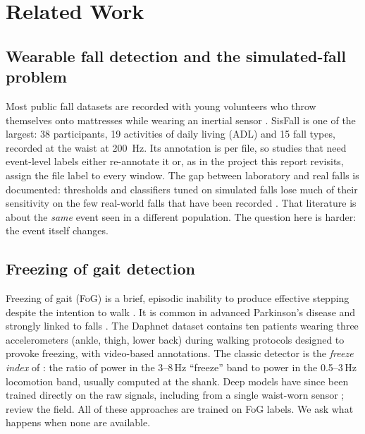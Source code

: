 \chapter{Related Work}
\label{ch:related}

\section{Wearable fall detection and the simulated-fall problem}

Most public fall datasets are recorded with young volunteers who throw themselves onto mattresses
while wearing an inertial sensor \parencite{casilari2017datasets}. SisFall \parencite{sucerquia2017sisfall} is one of the
largest: 38 participants, 19 activities of daily living (ADL) and 15 fall types, recorded at the
waist at \SI{200}{\hertz}. Its annotation is per file, so studies that need event-level labels either
re-annotate it \parencite{musci2021online} or, as in the project this report revisits, assign the file label
to every window. The gap between laboratory and real falls is documented: thresholds and classifiers
tuned on simulated falls lose much of their sensitivity on the few real-world falls that have been
recorded \parencite{bagala2012realfalls,broadley2018realworld}. That literature is about the \emph{same} event
seen in a different population. The question here is harder: the event itself changes.

\section{Freezing of gait detection}

Freezing of gait (FoG) is a brief, episodic inability to produce effective stepping despite the
intention to walk \parencite{nutt2011fog}. It is common in advanced Parkinson's disease and strongly linked to
falls \parencite{bloem2021parkinson,allen2013falls}. The Daphnet dataset \parencite{bachlin2010daphnet} contains ten patients
wearing three accelerometers (ankle, thigh, lower back) during walking protocols designed to provoke
freezing, with video-based annotations. The classic detector is the \emph{freeze index} of
\textcite{moore2008freeze}: the ratio of power in the 3--8\,Hz ``freeze'' band to power in the 0.5--3\,Hz
locomotion band, usually computed at the shank. Deep models have since been trained directly on
the raw signals, including from a single waist-worn sensor \parencite{camps2018waist}; \textcite{pardoel2019review}
review the field. All of these approaches are trained on FoG labels. We ask what happens when none
are available.

